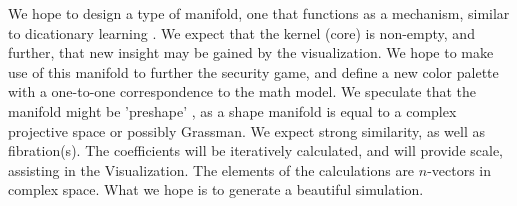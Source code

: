 We hope to design a type of manifold, one that functions as a
mechanism, similar to dicationary learning \citep{MIC}. We expect that the kernel
(core) is non-empty, and further, that new insight may be gained by the
visualization. We hope to make use of this manifold to further the security
game, and define a new color palette with a one-to-one correspondence to the
math model. We speculate that the manifold might be 'preshape' \citep{MIC}, as a
shape manifold is equal to a complex projective space or possibly
Grassman. We expect strong similarity, as well as fibration(s). The coefficients
will be iteratively calculated, and will provide scale, assisting in the
Visualization. The elements of the calculations are $n$-vectors in complex
space. What we hope is to generate a beautiful simulation.

